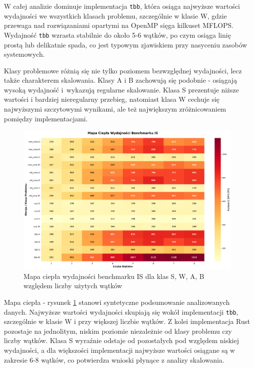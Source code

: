 W całej analizie dominuje implementacja \texttt{tbb}, która osiąga najwyższe wartości wydajności we wszystkich klasach problemu, szczególnie w klasie W, gdzie przewaga nad rozwiązaniami opartymi na OpenMP sięga kilkuset MFLOPS. Wydajność \texttt{tbb} wzrasta stabilnie do około 5-6 wątków, po czym osiąga linię prostą lub delikatnie spada, co jest typowym zjawiskiem przy nasyceniu zasobów systemowych.

Klasy problemowe różnią się nie tylko poziomem bezwzględnej wydajności, lecz także charakterem skalowania. Klasy A i B zachowują się podobnie - osiągają wysoką wydajność i~wykazują regularne skalowanie. Klasa S prezentuje niższe wartości i bardziej nieregularny przebieg, natomiast klasa W cechuje się najwyższymi szczytowymi wynikami, ale też największym zróżnicowaniem pomiędzy implementacjami.

\begin{figure}[H]
    \centering
    \includegraphics[width=\textwidth]{analiza/images/parallel/is/x86/is_mapa_ciepla_wydajnosci.png}
    \caption{Mapa ciepła wydajności benchmarku IS dla klas S, W, A, B względem liczby użytych wątków}
    \label{is_heatmap_bench_wydajnosci_x86}
\end{figure}
Mapa ciepła - rysunek \ref{is_heatmap_bench_wydajnosci_x86} stanowi syntetyczne podsumowanie analizowanych danych. Najwyższe wartości wydajności skupiają się wokół implementacji \texttt{tbb}, szczególnie w klasie W i przy większej liczbie wątków. Z kolei implementacja Rust pozostaje na jednolitym, niskim poziomie niezależnie od klasy problemu czy liczby wątków. Klasa S wyraźnie odstaje od pozostałych pod względem niskiej wydajności, a dla większości implementacji najwyższe wartości osiągane są w zakresie 6-8 wątków, co potwierdza wnioski płynące z analizy skalowania.

